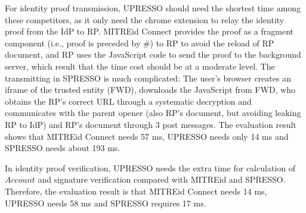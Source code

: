 For identity proof transmission, UPRESSO should need the shortest time among these competitors, as it only need the chrome extension to relay the identity proof from the IdP to RP. MITREid Connect provides the proof as a fragment component (i.e., proof is preceded by \#) to RP to avoid the reload of RP document, and RP uses the JavaScript code to send the proof to the background server, which result that the time cost should be at a moderate level. The transmitting in SPRESSO is much complicated: The user's browser creates an iframe of the trusted entity (FWD), downloads the JavaScript from FWD, who obtains the RP's correct URL through a systematic decryption and communicates with the parent opener (also RP's document, but avoiding leaking RP to IdP) and RP's document through 3 post messages. The evaluation result shows that MITREid Connect needs 57 ms, UPRESSO needs only 14 ms and SPRESSO needs about 193 ms.



In identity proof verification, UPRESSO needs the extra time for calculation of $Account$ and signature verification compared with MITREid and SPRESSO. Therefore, the evaluation result is that MITREid Connect needs 14 ms, UPRESSO needs 58 ms and SPRESSO requires 17 ms.



